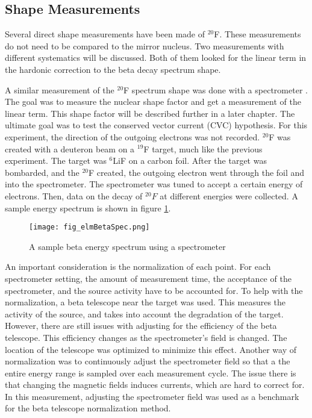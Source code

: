 \documentclass[main.tex]{subfiles}
\begin{document}
\subsection{Shape Measurements} 

Several direct shape measurements have been made of $^{20}$F.
These measurements do not need to be compared to the mirror nucleus.
Two measurements with different systematics will be discussed.
Both of them looked for the linear term in the hardonic correction to the beta decay spectrum shape. 

A similar measurement of the $^{20}$F spectrum shape was done with a spectrometer \cite{Elm87}.
The goal was to measure the nuclear shape factor and get a measurement of the linear term.
This shape factor will be described further in a later chapter.
The ultimate goal was to test the conserved vector current (CVC) hypothesis. 
For this experiment, the direction of the outgoing electrons was not recorded.
$^{20}$F was created with a deuteron beam on a $^{19}$F target, much like the previous experiment.
The target was $^{6}$LiF on a carbon foil.
After the target was bombarded, and the $^{20}$F created, the outgoing electron went through the foil and into the spectrometer.
The spectrometer was tuned to accept a certain energy of electrons. 
Then, data on the decay of $^{20}F$ at different energies were collected.
A sample energy spectrum is shown in figure \ref{fig:elmspec}.

\begin{figure}[!htb]
	\centerline{\texttt{[image: fig\_elmBetaSpec.png]}}
	\caption{A sample beta energy spectrum using a spectrometer \cite{Elm87}}
	\label{fig:elmspec}
\end{figure}


An important consideration is the normalization of each point.
For each spectrometer setting, the amount of measurement time, the acceptance of the spectrometer, and the source activity have to be accounted for.
To help with the normalization, a beta telescope near the target was used.
This measures the activity of the source, and takes into account the degradation of the target.
However, there are still issues with adjusting for the efficiency of the beta telescope.
This efficiency changes as the spectrometer's field is changed.
The location of the telescope was optimized to minimize this effect.
Another way of normalization was to continuously adjust the spectrometer field so that a the entire energy range is sampled over each measurement cycle.
The issue there is that changing the magnetic fields induces currents, which are hard to correct for. 
In this measurement, adjusting the spectrometer field was used as a benchmark for the beta telescope normalization method.
\end{document}
